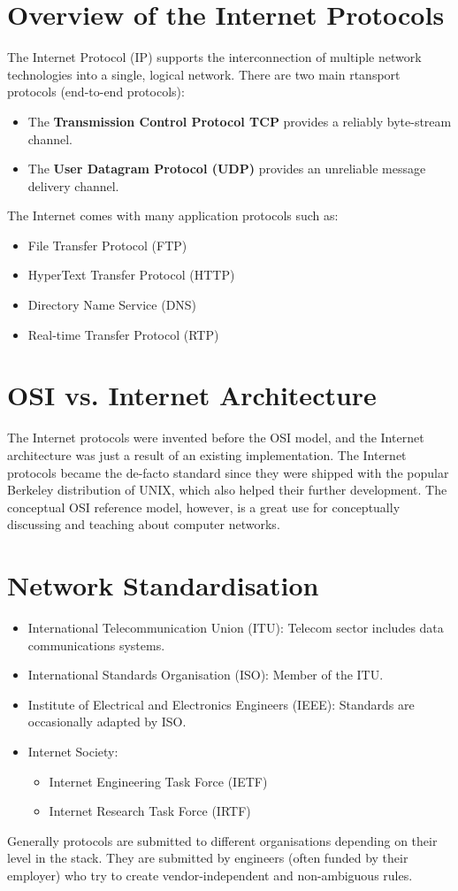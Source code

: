 \documentclass[11pt]{article}
\begin{document}
\section{Overview of the Internet Protocols}
\label{sec:org36fe112}
The Internet Protocol (IP) supports the interconnection of multiple network technologies into a single, logical network.
There are two main rtansport protocols (end-to-end protocols):
\begin{itemize}
\item The \textbf{Transmission Control Protocol TCP} provides a reliably byte-stream channel.
\item The \textbf{User Datagram Protocol (UDP)} provides an unreliable message delivery channel.
\end{itemize}
The Internet comes with many application protocols such as:
\begin{itemize}
\item File Transfer Protocol (FTP)
\item HyperText Transfer Protocol (HTTP)
\item Directory Name Service (DNS)
\item Real-time Transfer Protocol (RTP)
\end{itemize}

\section{OSI vs. Internet Architecture}
\label{sec:org78c91c8}
The Internet protocols were invented before the OSI model, and the Internet architecture was just a result of an existing implementation.
The Internet protocols became the de-facto standard since they were shipped with the popular Berkeley distribution of UNIX, which also helped their further development.
The conceptual OSI reference model, however, is a great use for conceptually discussing and teaching about computer networks.

\section{Network Standardisation}
\label{sec:org4c1c95d}
\begin{itemize}
\item International Telecommunication Union (ITU): Telecom sector includes data communications systems.
\item International Standards Organisation (ISO): Member of the ITU.
\item Institute of Electrical and Electronics Engineers (IEEE): Standards are occasionally adapted by ISO.
\item Internet Society:
\begin{itemize}
\item Internet Engineering Task Force (IETF)
\item Internet Research Task Force (IRTF)
\end{itemize}
\end{itemize}
Generally protocols are submitted to different organisations depending on their level in the stack.
They are submitted by engineers (often funded by their employer) who try to create vendor-independent and non-ambiguous rules.
\end{document}
